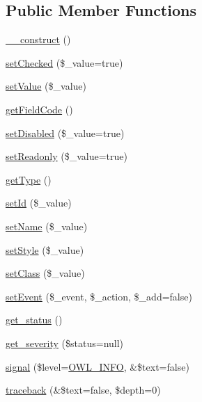 \subsection*{Public Member Functions}
\begin{DoxyCompactItemize}
\item 
\hyperlink{classFormFieldCheckbox_a9ea37cd03013e361f11680049c1a0097}{\_\-\_\-construct} ()
\item 
\hyperlink{classFormFieldCheckbox_a944623b7e1136bab6dd9880980037425}{setChecked} (\$\_\-value=true)
\item 
\hyperlink{classFormFieldCheckbox_a787abee157599c389a18e0810f69fed5}{setValue} (\$\_\-value)
\item 
\hyperlink{classFormFieldCheckbox_aaa7647c07d938553d8bec7afa869ebc0}{getFieldCode} ()
\item 
\hyperlink{classFormField_a9fa2c828eaf98154edfaa2e755657117}{setDisabled} (\$\_\-value=true)
\item 
\hyperlink{classFormField_a6eabbb35d24b1698ea25b66ddfd88a64}{setReadonly} (\$\_\-value=true)
\item 
\hyperlink{classFormField_a1f64b737bccb6b2827f8c5665b9920c7}{getType} ()
\item 
\hyperlink{classBaseElement_a0c1ce3d1684ecb78960cf7a97278494e}{setId} (\$\_\-value)
\item 
\hyperlink{classBaseElement_a39bafb3609d10048920c20242c2a04c5}{setName} (\$\_\-value)
\item 
\hyperlink{classBaseElement_a6b2b9ff69f6e92db82f91d9c55cda697}{setStyle} (\$\_\-value)
\item 
\hyperlink{classBaseElement_af6597b30fa9798878f6290271043dfa2}{setClass} (\$\_\-value)
\item 
\hyperlink{classBaseElement_ad5789f45f16aaa144716ee8558069c31}{setEvent} (\$\_\-event, \$\_\-action, \$\_\-add=false)
\item 
\hyperlink{class__OWL_a99ec771fa2c5c279f80152cc09e489a8}{get\_\-status} ()
\item 
\hyperlink{class__OWL_adf9509ef96858be7bdd9414c5ef129aa}{get\_\-severity} (\$status=null)
\item 
\hyperlink{class__OWL_a51ba4a16409acf2a2f61f286939091a5}{signal} (\$level=\hyperlink{owl_8severitycodes_8php_a139328861128689f2f4def6a399d9057}{OWL\_\-INFO}, \&\$text=false)
\item 
\hyperlink{class__OWL_aa29547995d6741b7d2b90c1d4ea99a13}{traceback} (\&\$text=false, \$depth=0)
\end{DoxyCompactItemize}
